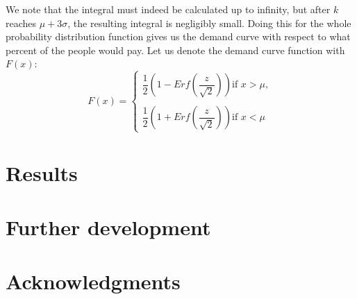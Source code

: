\documentclass[11pt, a4paper]{article}
\begin{document}
		We note that the integral must indeed be calculated up to infinity, but after $k$ reaches $\mu+3\sigma$, the resulting integral is negligibly small. Doing this for the whole probability distribution function gives us the demand curve with respect to what percent of the people would pay. Let us denote the demand curve function with $F(x)$:
		$$
		F(x)=
		\begin{cases}
			\dfrac{1}{2}\left (1-Erf\left (\dfrac{z}{\sqrt{2}}\right )\right ) \text{if } x>\mu,\\
			\\
			\dfrac{1}{2}\left (1+Erf\left (\dfrac{z}{\sqrt{2}}\right )\right ) \text{if } x<\mu
		\end{cases}
		$$
		
\section{Results}
\section{Further development}
\section*{Acknowledgments}
\nocite{*}


\end{document}
